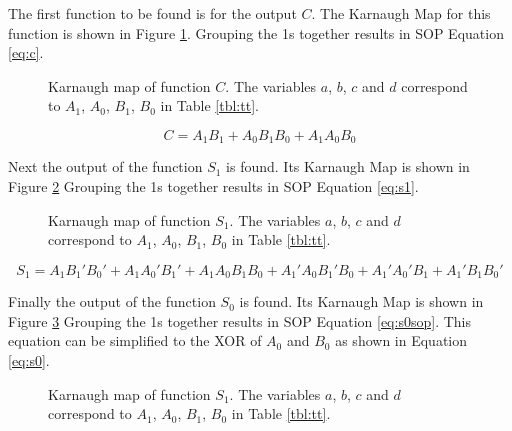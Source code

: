\documentclass[12pt]{article}
\begin{document}
The first function to be found is for the output $C$.
The Karnaugh Map for this function is shown in Figure \ref{fig:kmc}.
Grouping the 1s together results in SOP Equation \ref{eq:c}.

\begin{figure}[hbp]
\begin{center}
\end{center}
\caption{Karnaugh map of function $C$.
The variables $a$, $b$, $c$ and $d$ correspond to
$A_1$, $A_0$, $B_1$, $B_0$ in Table \ref{tbl:tt}.}
\label{fig:kmc}
\end{figure}

\begin{equation}
C = A_1 B_1 + A_0 B_1 B_0 + A_1 A_0 B_0 \label{eq:c}
\end{equation}

Next the output of the function $S_1$ is found.
Its Karnaugh Map is shown in Figure \ref{fig:kms1}
Grouping the 1s together results in SOP Equation \ref{eq:s1}.

\begin{figure}[hbp]
\begin{center}
\end{center}
\caption{Karnaugh map of function $S_1$.
The variables $a$, $b$, $c$ and $d$ correspond to
$A_1$, $A_0$, $B_1$, $B_0$ in Table \ref{tbl:tt}.}
\label{fig:kms1}
\end{figure}

\begin{equation}
S_1 = A_1 B_1' B_0'
	+ A_1 A_0' B_1'
	+ A_1 A_0 B_1 B_0
	+ A_1' A_0 B_1' B_0
	+ A_1' A_0' B_1
	+ A_1' B_1 B_0' \label{eq:s1}
\end{equation}

Finally the output of the function $S_0$ is found.
Its Karnaugh Map is shown in Figure \ref{fig:kms0}
Grouping the 1s together results in SOP Equation \ref{eq:s0sop}.
This equation can be simplified to the XOR of $A_0$ and $B_0$
as shown in Equation \ref{eq:s0}.

\begin{figure}[hbp]
\begin{center}
\end{center}
\caption{Karnaugh map of function $S_1$.
The variables $a$, $b$, $c$ and $d$ correspond to
$A_1$, $A_0$, $B_1$, $B_0$ in Table \ref{tbl:tt}.}
\label{fig:kms0}
\end{figure}
\end{document}

